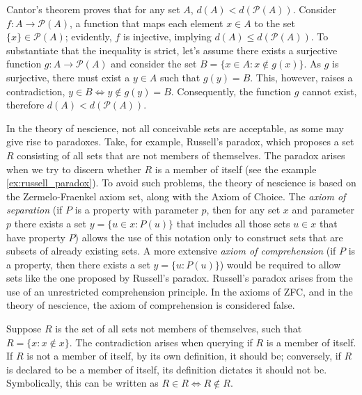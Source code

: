 \begin{example}
\label{cantor_theorem}
Cantor's theorem proves that for any set $A$, $d(A) < d\left(\mathcal{P}(A)\right)$. Consider $f: A \rightarrow \mathcal{P}(A)$, a function that maps each element $x \in A$ to the set $\{x\} \in \mathcal{P}(A)$; evidently, $f$ is injective, implying $d(A) \leq d\left(\mathcal{P}(A)\right)$. To substantiate that the inequality is strict, let's assume there exists a surjective function $g: A \rightarrow \mathcal{P}(A)$ and consider the set $B = \{ x \in A : x \notin g(x) \}$. As $g$ is surjective, there must exist a $y \in A$ such that $g(y) = B$. This, however, raises a contradiction, $y \in B \Leftrightarrow y \notin g(y) = B$. Consequently, the function $g$ cannot exist, therefore $d(A) < d\left(\mathcal{P}(A)\right)$.
\end{example}

In the theory of nescience, not all conceivable sets are acceptable, as some may give rise to paradoxes. Take, for example, Russell's paradox, which proposes a set $R$ consisting of all sets that are not members of themselves. The paradox arises when we try to discern whether $R$ is a member of itself (see the example \ref{ex:russell_paradox}). To avoid such problems, the theory of nescience is based on the Zermelo-Fraenkel axiom set, along with the Axiom of Choice. The \emph{axiom of separation} (if $P$ is a property with parameter $p$, then for any set $x$ and parameter $p$ there exists a set $y=\{u \in x : P(u) \}$ that includes all those sets $u \in x$ that have property $P$) allows the use of this notation only to construct sets that are subsets of already existing sets. A more extensive \emph{axiom of comprehension} (if $P$ is a property, then there exists a set $y=\{u : P(u) \}$) would be required to allow sets like the one proposed by Russell's paradox. Russell's paradox arises from the use of an unrestricted comprehension principle. In the axioms of ZFC, and in the theory of nescience, the axiom of comprehension is considered false.

\begin{example}
\label{ex:russell_paradox}
Suppose $R$ is the set of all sets not members of themselves, such that $R = \{ x : x \notin x \}$. The contradiction arises when querying if $R$ is a member of itself. If $R$ is not a member of itself, by its own definition, it should be; conversely, if $R$ is declared to be a member of itself, its definition dictates it should not be. Symbolically, this can be written as $R \in R \Leftrightarrow R \notin R$.
\end{example}

